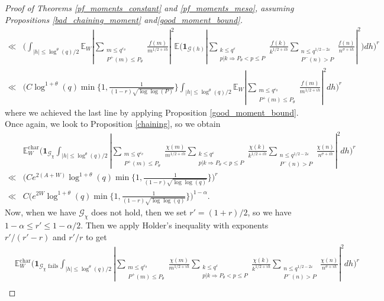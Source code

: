 \documentclass[10pt,a4paper]{amsart}
\numberwithin{equation}{section}
\begin{document}
\begin{proof}[Proof of Theorems \ref{pf_moments_constant} and \ref{pf_moments_meso}, assuming Propositions \ref{bad_chaining_moment} and\ref{good_moment_bound}]
\begin{align*}
        \ll &\big(\int_{|h|\leq \log^\theta(q)/2}\mathbb{E}_W|\sum_{\substack{m \leq q^{\varepsilon_\theta} \\ P^+(m) \leq P_\theta}}\frac{f(m)}{m^{1/2+ih}}|^2\mathbb{E}\big(\mathbf{1}_{\mathcal{G}(h)}|\sum_{\substack{k \leq q^{\varepsilon} \\ p|k \Rightarrow P_\theta < p \leq P}}\frac{f(k)}{k^{1/2+ih}}\sum_{\substack{n \leq q^{1/2-2\varepsilon} \\ P^{-}(n) > P}}\frac{f(n)}{n^{\sigma+ih}}|^2\big)dh\big)^r \\
        \ll&\big(C\log^{1+\theta}(q)\min\{1,\frac{1}{(1-r)\sqrt{\log\log(P)}}\}\int_{|h| \leq \log^\theta(q)/2}\mathbb{E}_W|\sum_{\substack{m \leq q^{\varepsilon_\theta} \\ P^+(m) \leq P_\theta}}\frac{f(m)}{m^{1/2+ih}}|^2dh\big)^r
    \end{align*}
    where we achieved the last line by applying Proposition \ref{good_moment_bound}. Once again, we look to Proposition \ref{chaining}, so we obtain
    \begin{align*}
        &\mathbb{E}_W^{\text{char}}\big(\mathbf{1}_{\mathcal{G}_\chi}\int_{|h|\leq \log^\theta(q)/2}|\sum_{\substack{m \leq q^{\varepsilon_\theta} \\ P^+(m) \leq P_\theta}}\frac{\chi(m)}{m^{1/2+ih}}\sum_{\substack{k \leq q^{\varepsilon} \\ p|k \Rightarrow P_\theta < p \leq P}}\frac{\chi(k)}{k^{1/2+ih}}\sum_{\substack{n \leq q^{1/2-2\varepsilon} \\ P^{-}(n) > P}}\frac{\chi(n)}{n^{\sigma+ih}}|^2dh\big)^r \\
        \ll& \big(Ce^{2(A+W)}\log^{1+\theta}(q)\min\{1,\frac{1}{(1-r)\sqrt{\log\log(q)}}\}\big)^r \\ \ll& C\big(e^{2W}\log^{1+\theta}(q)\min\{1,\frac{1}{(1-r)\sqrt{\log\log(q)}}\}\big)^{1-\alpha}.
    \end{align*}
    Now, when we have $\mathcal{G}_\chi$ does not hold, then we set $r' = (1+r)/2$, so we have $1-\alpha \leq r' \leq 1-\alpha/2$. Then we apply Holder's inequality with exponents $r'/(r'-r)$ and $r'/r$ to get
    \begin{align*}
        &\mathbb{E}_W^{\text{char}}\big(\mathbf{1}_{\mathcal{G}_\chi \text{ fails}}\int_{|h|\leq \log^\theta(q)/2}|\sum_{\substack{m \leq q^{\varepsilon_\theta} \\ P^+(m) \leq P_\theta}}\frac{\chi(m)}{m^{1/2+ih}}\sum_{\substack{k \leq q^{\varepsilon} \\ p|k \Rightarrow P_\theta < p \leq P}}\frac{\chi(k)}{k^{1/2+ih}}\sum_{\substack{n \leq q^{1/2-2\varepsilon} \\ P^{-}(n) > P}}\frac{\chi(n)}{n^{\sigma+ih}}|^2dh\big)^r \\

\end{align*}
\end{proof}
\end{document}
